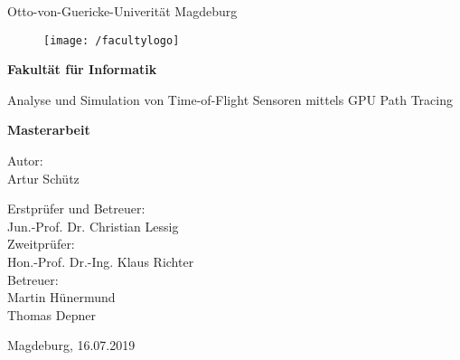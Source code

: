 \documentclass[thesis.tex]{subfiles}
\begin{document}
\thispagestyle {empty}

\begin{center}
\begin{Large}
Otto-von-Guericke-Univerität Magdeburg\\

\begin{figure}
	\centering
	\texttt{[image: /facultylogo]}
	\label{fig:logoinffak}
\end{figure}

\vspace{3mm}

\textbf{Fakultät für Informatik}\\
\end{Large}

\vspace{8mm}
\vspace{1cm}

\begin{Huge}
Analyse und Simulation von Time-of-Flight Sensoren mittels GPU Path Tracing\\
\end{Huge}
\vspace{15mm}
{\Huge \textbf{Masterarbeit}}\\
\vspace{15mm}

Autor:\\
\vspace{4mm}
{\huge Artur Schütz}\\

\vspace{16mm}

Erstprüfer und Betreuer:\\
\vspace{2mm}
{\Large Jun.-Prof. Dr. Christian Lessig}\\
\vspace{4mm}
Zweitprüfer:\\
\vspace{2mm}
{\Large Hon.-Prof. Dr.-Ing. Klaus Richter}\\
\vspace{10mm}
Betreuer:\\
\vspace{2mm}
{\large Martin Hünermund}\\
\vspace{2mm}
{\large Thomas Depner}\\

\vspace{28mm}

{\large Magdeburg, 16.07.2019}\\

\vspace{40mm}

\end{center}
\clearpage
\end{document}
